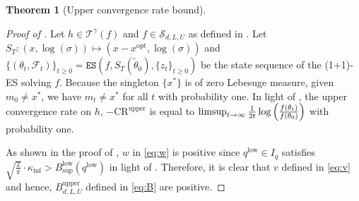 \documentclass[journal]{IEEEtran}
\providecommand{\limsup}{\operatornamewithlimits{limsup}} %
\renewcommand{\geq}{\geqslant} %
\newtheorem{theorem}{Theorem}[]
\theoremstyle{definition}
\newcommand{\mori}[1]{{\color[rgb]{0.22, 0.71, 0.55} MORINAGA :  #1}}
\newcommand{\aup}{\alpha_{\uparrow}}
\newcommand{\adown}{\alpha_{\downarrow}}
\begin{document}
\begin{theorem}[Upper convergence rate bound]
\end{theorem}


\begin{proof}[Proof of ]
Let $h \in \mathcal{T}^{\gamma}(f)$ and $f \in \mathcal{S}_{d, L, U}$ as defined in .
Let $S_T : (x, \log(\sigma)) \mapsto (x - x^\mathrm{opt}, \log(\sigma))$ and $\{(\theta_t, \mathcal{F}_t)\}_{t \geq 0} = \texttt{ES}(f, S_T(\tilde{\theta}_0), \{z_t\}_{t \geq 0})$ be the state sequence of the (1+1)-ES solving $f$.
Because the singleton $\{x^*\}$ is of zero Lebesuge measure, given $m_0 \neq x^*$, we have $m_t \neq x^*$ for all $t$ with probability one.
In light of , the upper convergence rate on $h$, $-\mathrm{CR}^\mathrm{upper}$ is equal to
$\limsup_{t \to \infty} \frac{1}{2t} \log\left(\frac{f(\theta_t)}{f(\theta_0)}\right)$
with probability one.

As shown in the proof of , $w$ in \eqref{eq:w} is positive since $q^\mathrm{low}\in I_q$ satisfies $\sqrt{\frac{2}{\pi}}\cdot\kappa_\mathrm{inf}>B_\mathrm{sup}^\mathrm{low}(q^\mathrm{low})$ in light of .
Therefore, it is clear that $v$ defined in \eqref{eq:v} and hence, $B_{d, L, U}^\mathrm{upper}$ defined in \eqref{eq:B} are positive.


\end{proof}
\end{document}
